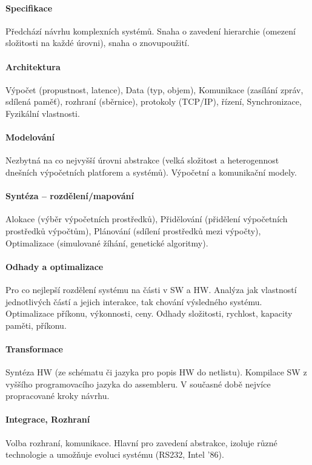 \documentclass[a4paper, 11pt]{report}
\begin{document}
\paragraph{Specifikace}
Předchází návrhu komplexních systémů. Snaha o zavedení hierarchie (omezení složitosti na každé úrovni), snaha o znovupoužití.

\paragraph{Architektura}
Výpočet (propustnost, latence), Data (typ, objem), Komunikace (zasílání zpráv, sdílená paměť), rozhraní (sběrnice), protokoly (TCP/IP), řízení, Synchronizace, Fyzikální vlastnosti.

\paragraph{Modelování}
Nezbytná na co nejvyšší úrovni abstrakce (velká složitost a heterogennost dnešních výpočetních platforem a systémů). Výpočetní a komunikační modely.

\paragraph{Syntéza -- rozdělení/mapování}
Alokace (výběr výpočetních prostředků), Přidělování (přidělení výpočetních prostředků výpočtům), Plánování (sdílení prostředků mezi výpočty), Optimalizace (simulované žíhání, genetické algoritmy).

\paragraph{Odhady a optimalizace}
Pro co nejlepší rozdělení systému na části v SW a HW. Analýza jak vlastností jednotlivých částí a jejich interakce, tak chování výsledného systému. Optimalizace příkonu, výkonnosti, ceny. Odhady složitosti, rychlost, kapacity paměti, příkonu.

\paragraph{Transformace}
Syntéza HW (ze schématu či jazyka pro popis HW do netlistu). Kompilace SW z vyššího programovacího jazyka do assembleru. V současné době nejvíce propracované kroky návrhu.

\paragraph{Integrace, Rozhraní}
Volba rozhraní, komunikace. Hlavní pro zavedení abstrakce, izoluje různé technologie a umožňuje evoluci systému (RS232, Intel '86).
\end{document}
